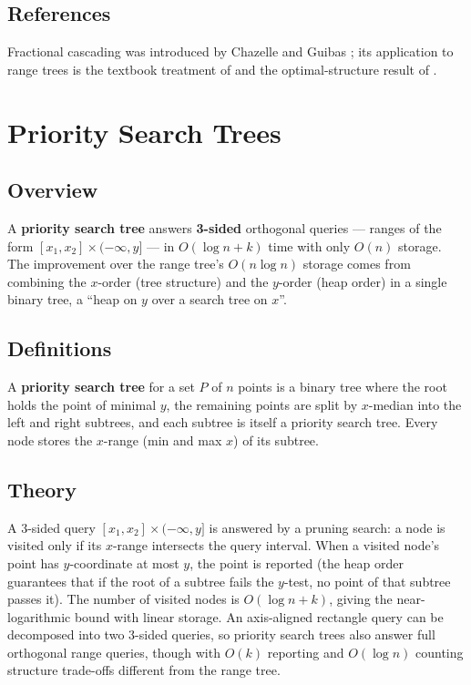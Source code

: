 \subsection{References}

Fractional cascading was introduced by Chazelle and Guibas \cite{chazelle1986cascading};
its application to range trees is the textbook treatment of \cite{berg2008}
and the optimal-structure result of \cite{willard1985}.

\section{Priority Search Trees}
\label{sec:rangesearch_priority_search}

\subsection{Overview}

A \textbf{priority search tree} \cite{mccreight1985}
answers \textbf{3-sided} orthogonal queries --- ranges of the form
$[x_1,x_2] \times (-\infty, y]$ --- in $O(\log n + k)$ time with only
$O(n)$ storage. The improvement over the range tree's $O(n \log n)$
storage comes from combining the $x$-order (tree structure) and the
$y$-order (heap order) in a single binary tree, a ``heap on $y$ over a
search tree on $x$''.

\subsection{Definitions}

\begin{definition}\label{def:priority_search_tree}
  A \textbf{priority search tree} for a set $P$ of $n$ points is a binary
  tree where the root holds the point of minimal $y$, the remaining points
  are split by $x$-median into the left and right subtrees, and each
  subtree is itself a priority search tree. Every node stores the
  $x$-range (min and max $x$) of its subtree.
\end{definition}

\subsection{Theory}

A 3-sided query $[x_1,x_2] \times (-\infty, y]$ is answered by a pruning
search: a node is visited only if its $x$-range intersects the query
interval. When a visited node's point has $y$-coordinate at most $y$, the
point is reported (the heap order guarantees that if the root of a subtree
fails the $y$-test, no point of that subtree passes it). The number of
visited nodes is $O(\log n + k)$, giving the near-logarithmic bound with
linear storage. An axis-aligned rectangle query can be decomposed into two
3-sided queries, so priority search trees also answer full orthogonal
range queries, though with $O(k)$ reporting and $O(\log n)$ counting
structure trade-offs different from the range tree.

